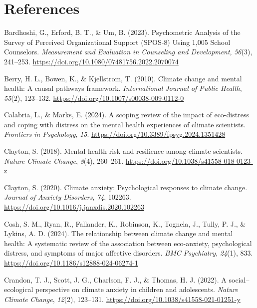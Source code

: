 \documentclass[
  man,
  longtable,
  nolmodern,
  notxfonts,
  notimes,
  colorlinks=true,linkcolor=blue,citecolor=blue,urlcolor=blue]{apa7}
\newlength{\cslhangindent}
\newenvironment{CSLReferences}[2] %
 {\begin{list}{}{%
  \setlength{\itemindent}{0pt}
  \setlength{\leftmargin}{0pt}
  \setlength{\parsep}{0pt}
  \ifodd #1
   \setlength{\leftmargin}{\cslhangindent}
   \setlength{\itemindent}{-1\cslhangindent}
  \fi
  \setlength{\itemsep}{#2\baselineskip}}}
 {\end{list}}
\begin{document}
\section{References}\label{references}

\label{refs}
\begin{CSLReferences}{1}{0}
Bardhoshi, G., Erford, B. T., \& Um, B. (2023). Psychometric {Analysis}
of the {Survey} of {Perceived} {Organizational} {Support} ({SPOS}-8)
{Using} 1,005 {School} {Counselors}. \emph{Measurement and Evaluation in
Counseling and Development}, \emph{56}(3), 241--253.
\url{https://doi.org/10.1080/07481756.2022.2070074}

Berry, H. L., Bowen, K., \& Kjellstrom, T. (2010). Climate change and
mental health: A causal pathways framework. \emph{International Journal
of Public Health}, \emph{55}(2), 123--132.
\url{https://doi.org/10.1007/s00038-009-0112-0}

Calabria, L., \& Marks, E. (2024). A scoping review of the impact of
eco-distress and coping with distress on the mental health experiences
of climate scientists. \emph{Frontiers in Psychology}, \emph{15}.
\url{https://doi.org/10.3389/fpsyg.2024.1351428}

Clayton, S. (2018). Mental health risk and resilience among climate
scientists. \emph{Nature Climate Change}, \emph{8}(4), 260--261.
\url{https://doi.org/10.1038/s41558-018-0123-z}

Clayton, S. (2020). Climate anxiety: {Psychological} responses to
climate change. \emph{Journal of Anxiety Disorders}, \emph{74}, 102263.
\url{https://doi.org/10.1016/j.janxdis.2020.102263}

Cosh, S. M., Ryan, R., Fallander, K., Robinson, K., Tognela, J., Tully,
P. J., \& Lykins, A. D. (2024). The relationship between climate change
and mental health: A systematic review of the association between
eco-anxiety, psychological distress, and symptoms of major affective
disorders. \emph{BMC Psychiatry}, \emph{24}(1), 833.
\url{https://doi.org/10.1186/s12888-024-06274-1}

Crandon, T. J., Scott, J. G., Charlson, F. J., \& Thomas, H. J. (2022).
A social--ecological perspective on climate anxiety in children and
adolescents. \emph{Nature Climate Change}, \emph{12}(2), 123--131.
\url{https://doi.org/10.1038/s41558-021-01251-y}


\end{CSLReferences}
\end{document}
